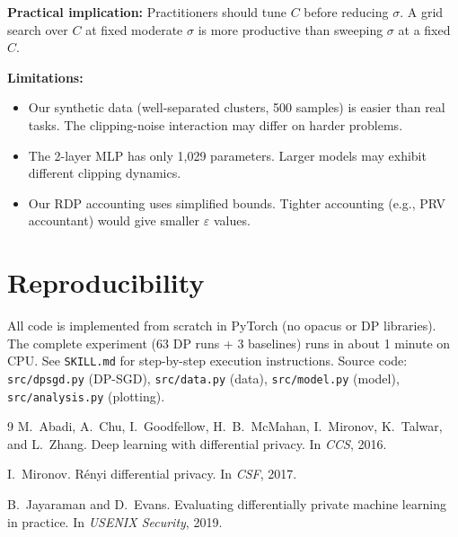 \documentclass[11pt,a4paper]{article}
\begin{document}
\textbf{Practical implication:} Practitioners should tune $C$ before
reducing $\sigma$. A grid search over $C$ at fixed moderate $\sigma$ is
more productive than sweeping $\sigma$ at a fixed $C$.

\textbf{Limitations:}
\begin{itemize}
    \item Our synthetic data (well-separated clusters, 500 samples) is
    easier than real tasks. The clipping-noise interaction may differ on
    harder problems.
    \item The 2-layer MLP has only 1,029 parameters. Larger models may
    exhibit different clipping dynamics.
    \item Our RDP accounting uses simplified bounds. Tighter accounting
    (e.g., PRV accountant) would give smaller $\varepsilon$ values.
\end{itemize}

\section{Reproducibility}

All code is implemented from scratch in PyTorch (no opacus or DP libraries).
The complete experiment (63 DP runs + 3 baselines) runs in about 1 minute
on CPU. See \texttt{SKILL.md} for step-by-step execution instructions.
Source code: \texttt{src/dpsgd.py} (DP-SGD), \texttt{src/data.py} (data),
\texttt{src/model.py} (model), \texttt{src/analysis.py} (plotting).

\begin{thebibliography}{9}
M.~Abadi, A.~Chu, I.~Goodfellow, H.~B.~McMahan, I.~Mironov, K.~Talwar,
and L.~Zhang.
\newblock Deep learning with differential privacy.
\newblock In \emph{CCS}, 2016.

I.~Mironov.
\newblock R\'{e}nyi differential privacy.
\newblock In \emph{CSF}, 2017.

B.~Jayaraman and D.~Evans.
\newblock Evaluating differentially private machine learning in practice.
\newblock In \emph{USENIX Security}, 2019.
\end{thebibliography}
\end{document}
